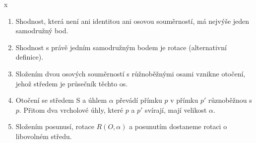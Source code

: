 \documentclass[../main.tex]{subfiles}
\begin{document}
\begin{remark}
    {\color{white} x}
    \begin{enumerate}
        \item Shodnost, která není ani identitou ani osovou souměrností, má nejvýše jeden samodružný bod.
        \item Shodnost s právě jedním samodružným bodem je rotace (alternativní definice).
        \item Složením dvou osových souměrností s růžnoběžnými osami vznikne otočení, jehož středem je průsečník těchto os.
        \item Otočení se středem S a úhlem $\alpha$ převádí přímku $p$ v přímku $p'$ různoběžnou s $p$. Přitom
        dva vrcholové úhly, které $p$ a $p'$ svírají, mají velikost $\alpha$.
        \item Složením posunusí, rotace $R(O,\alpha)$ a posunutím dostaneme rotaci o libovolném středu.
    \end{enumerate}
\end{remark}
\end{document}
